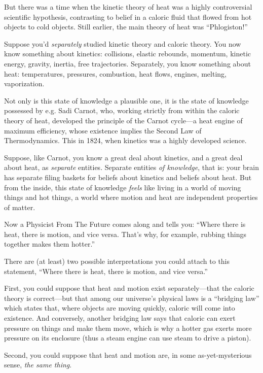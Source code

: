 {
 But there was a time when the kinetic theory of heat was a highly
controversial scientific hypothesis, contrasting to belief in a caloric
fluid that flowed from hot objects to cold objects. Still earlier, the
main theory of heat was
``Phlogiston!''}

{
 Suppose you'd \textit{separately} studied kinetic
theory and caloric theory. You now know something about kinetics:
collisions, elastic rebounds, momentum, kinetic energy, gravity,
inertia, free trajectories. Separately, you know something about heat:
temperatures, pressures, combustion, heat flows, engines, melting,
vaporization.}

{
 Not only is this state of knowledge a plausible one, it is the
state of knowledge possessed by e.g. Sadi Carnot, who, working strictly
from within the caloric theory of heat, developed the principle of the
Carnot cycle---a heat engine of maximum efficiency, whose existence
implies the Second Law of Thermodynamics. This in 1824, when kinetics
was a highly developed science.}

{
 Suppose, like Carnot, you know a great deal about kinetics, and a
great deal about heat, as \textit{separate} entities. Separate entities
\textit{of knowledge}, that is: your brain has separate filing baskets
for beliefs about kinetics and beliefs about heat. But from the inside,
this state of knowledge \textit{feels} like living in a world of moving
things and hot things, a world where motion and heat are independent
properties of matter.}

{
 Now a Physicist From The Future comes along and tells you:
``Where there is heat, there is motion, and vice
versa. That's why, for example, rubbing things together
makes them hotter.''}

{
 There are (at least) two possible interpretations you could attach
to this statement, ``Where there is heat, there is
motion, and vice versa.''}

{
 First, you could suppose that heat and motion exist
separately---that the caloric theory is correct---but that among our
universe's physical laws is a
``bridging law'' which states that,
where objects are moving quickly, caloric will come into existence. And
conversely, another bridging law says that caloric can exert pressure
on things and make them move, which is why a hotter gas exerts more
pressure on its enclosure (thus a steam engine can use steam to drive a
piston).}

{
 Second, you could suppose that heat and motion are, in some
as-yet-mysterious sense, \textit{the same thing}.}

